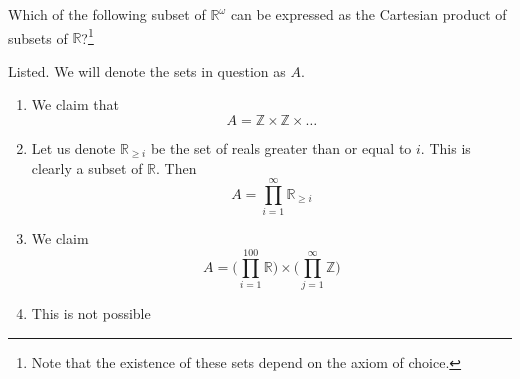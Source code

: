   \begin{exercise} 
    Which of the following subset of $\mathbb{R}^\omega$ can be expressed as the Cartesian product of subsets of $\mathbb{R}$?\footnote{Note that the existence of these sets depend on the axiom of choice.}
  \end{exercise}
  \begin{solution}
    Listed. We will denote the sets in question as $A$. 
    \begin{enumerate}
      \item We claim that 
        \begin{equation}
          A = \mathbb{Z} \times \mathbb{Z} \times \ldots
        \end{equation}
      \item Let us denote $\mathbb{R}_{\geq i}$ be the set of reals greater than or equal to $i$. This is clearly a subset of $\mathbb{R}$. Then 
        \begin{equation}
          A = \prod_{i=1}^\infty \mathbb{R}_{\geq i}
        \end{equation}
      \item We claim 
        \begin{equation}
          A = \bigg( \prod_{i=1}^{100} \mathbb{R} \bigg) \times \bigg( \prod_{j=1}^\infty \mathbb{Z} \bigg)
        \end{equation}
      \item This is not possible
    \end{enumerate}
  \end{solution}

